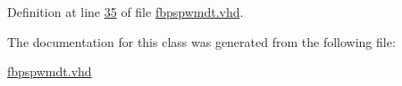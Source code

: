Definition at line \hyperlink{fbpspwmdt_8vhd_source_l00035}{35} of file \hyperlink{fbpspwmdt_8vhd_source}{fbpspwmdt.\+vhd}.



The documentation for this class was generated from the following file\+:\begin{DoxyCompactItemize}
\item 
\hyperlink{fbpspwmdt_8vhd}{fbpspwmdt.\+vhd}\end{DoxyCompactItemize}
